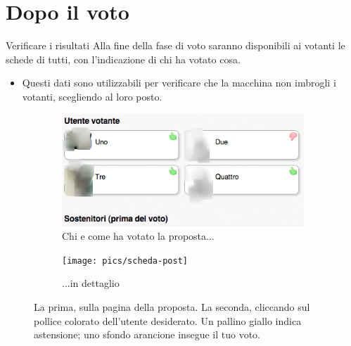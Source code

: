 \section{Dopo il voto}
\begin{frame}{Verificare i risultati}
Alla fine della fase di voto saranno disponibili ai votanti le schede di tutti, con l'indicazione di chi ha votato cosa.

\begin{itemize}\item Questi dati sono utilizzabili per verificare che la macchina non imbrogli i votanti, scegliendo al loro posto.\end{itemize}
\begin{figure}
	\begin{subfigure}[b]{.58\textwidth}
		\includegraphics[width=\textwidth,]{pics/voters}
		\caption{Chi e come ha votato la proposta...}
	\end{subfigure}
	\begin{subfigure}[b]{.34\textwidth}
		\texttt{[image: pics/scheda-post]}
		\caption{...in dettaglio}
	\end{subfigure}
\caption{La prima, sulla pagina della proposta. La seconda, cliccando sul pollice colorato dell'utente desiderato. Un pallino giallo indica astensione; uno sfondo arancione insegue il tuo voto.}
\end{figure}
\end{frame}


